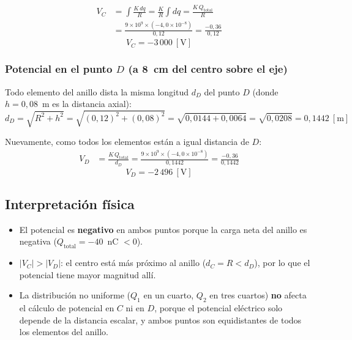 \documentclass[12pt,letterpaper]{article}
\begin{document}
\begin{align*}
    V_C &= \int \frac{K\,dq}{R}
         = \frac{K}{R}\int dq
         = \frac{K\,Q_\text{total}}{R} \\[6pt]
        &= \frac{9\times10^9 \times (-4{,}0\times10^{-8})}{0{,}12}
         = \frac{-0{,}36}{0{,}12}
\end{align*}
\[
    \boxed{V_C = -3\,000\ [\text{V}]}
\]

\subsubsection*{Potencial en el punto $D$ (a 8~cm del centro sobre el eje)}

Todo elemento del anillo dista la misma longitud $d_D$ del punto $D$
(donde $h = 0{,}08$~m es la distancia axial):
\[
    d_D = \sqrt{R^2 + h^2} = \sqrt{(0{,}12)^2 + (0{,}08)^2}
    = \sqrt{0{,}0144 + 0{,}0064} = \sqrt{0{,}0208} = 0{,}1442\ [\text{m}]
\]

Nuevamente, como todos los elementos est\'an a igual distancia de $D$:
\begin{align*}
    V_D &= \frac{K\,Q_\text{total}}{d_D}
         = \frac{9\times10^9 \times (-4{,}0\times10^{-8})}{0{,}1442}
         = \frac{-0{,}36}{0{,}1442}
\end{align*}
\[
    \boxed{V_D = -2\,496\ [\text{V}]}
\]

\subsection*{Interpretaci\'on f\'isica}

\begin{itemize}
    \item El potencial es \textbf{negativo} en ambos puntos porque la carga neta del anillo es
          negativa ($Q_\text{total} = -40$~nC $< 0$).
    \item $|V_C| > |V_D|$: el centro est\'a m\'as pr\'oximo al anillo ($d_C = R < d_D$), por
          lo que el potencial tiene mayor magnitud all\'i.
    \item La distribuci\'on no uniforme ($Q_1$ en un cuarto, $Q_2$ en tres cuartos) \textbf{no}
          afecta el c\'alculo de potencial en $C$ ni en $D$, porque el potencial el\'ectrico solo
          depende de la distancia escalar, y ambos puntos son equidistantes de todos los
          elementos del anillo.
\end{itemize}
\end{document}
